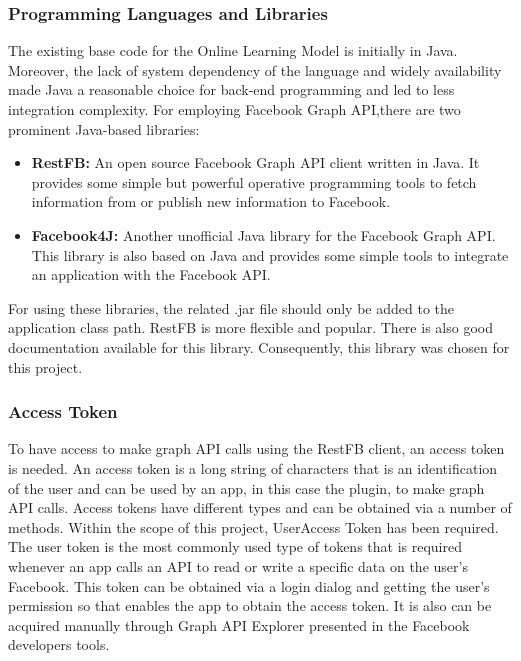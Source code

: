 \documentclass[a4paper,11pt]{article}
\begin{document}
\subsubsection{Programming Languages and Libraries}

The existing base code for the Online Learning Model is initially in Java. Moreover, the lack of system dependency of the language and widely availability made Java a reasonable choice for back-end programming and led to less integration complexity. For employing Facebook Graph API,there are two prominent Java-based libraries: 

\begin{itemize}

\item \textbf{RestFB:} An open source Facebook Graph API client written in Java. It provides some simple but powerful operative programming tools to fetch information from or publish new information to Facebook.

\item \textbf{Facebook4J:} Another unofficial Java library for the Facebook Graph API. This library is also based on Java and provides some simple tools to integrate an application with the Facebook API.


\end{itemize}

For using these libraries, the related .jar file should only be added to the application class path. RestFB is more flexible and popular. There is also good documentation available for this library. Consequently, this library was chosen for this project.

\subsubsection{Access Token}
To have access to make graph API calls using the RestFB client, an access token is needed. An access token is a long string of characters that is an identification of the user and can be used by an app, in this case the plugin, to make graph API calls. Access tokens have different types and can be obtained via a number of methods. Within the scope of this project, UserAccess Token has been required. The user token is the most commonly used type of tokens that is required whenever an app calls an API to read or write a specific data on the user’s Facebook. This token can be obtained via a login dialog and getting the user’s permission so that enables the app to obtain the access token. It is also can be acquired manually through Graph API Explorer presented in the Facebook developers tools. 
\end{document}
